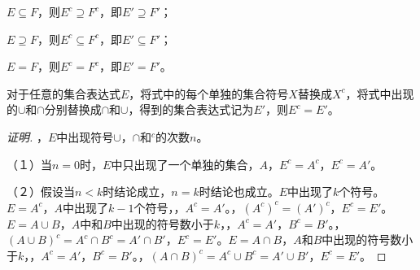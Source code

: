 \documentclass{beamer}
\begin{document}
\begin{CJK}{UTF8}{gbsn}
\begin{frame}
  $E\subseteq F$，则$E^c\supseteq F^c$，即$E'\supseteq F'$；

  $E\supseteq F$，则$E^c\subseteq F^c$，即$E'\subseteq F'$；

  $E=F$，则$E^c=F^c$，即$E'=F'$。
\end{frame}

\begin{frame}
  \begin{Thm4}
    对于任意的集合表达式$E$，将式中的每个单独的集合符号$X$替换成$X^c$，将式中出现的$\cup$和$\cap$分别替换成$\cap$和$\cup$，得到的集合表达式记为$E'$，则$E^c=E'$。
  \end{Thm4}
  \pause\begin{proof}[证明]\justifying\let\raggedright\justifying
    ，$E$中出现符号$\cup$，$\cap$和$^c$的次数$n$。

    \pause（１）当$n=0$时，\pause$E$中只出现了一个单独的集合，$A$，$E^c=A^c$，$E^c=A'$。

    \pause（２）假设当$n<k$时结论成立，$n=k$时结论也成立。$E$中出现了$k$个符号。$E=A^c$，$A$中出现了$k-1$个符号，，\pause $A^c=A'$。，\pause$(A^c)^c=(A')^c$，$E^c=E'$。$E=A\cup B$，$A$中和$B$中出现的符号数小于$k$，，\pause$A^c=A'$，\pause$B^c=B'$。，\pause$(A\cup B)^c=A^c\cap B^c=A'\cap B'$，$E^c=E'$。$E=A\cap B$，$A$和$B$中出现的符号数小于$k$，，\pause$A^c=A'$，\pause$B^c=B'$。，\pause$(A\cap B)^c=A^c\cup B^c=A'\cup B'$，$E^c=E'$。
  \end{proof}
\end{frame}

\end{CJK}
\end{document}

